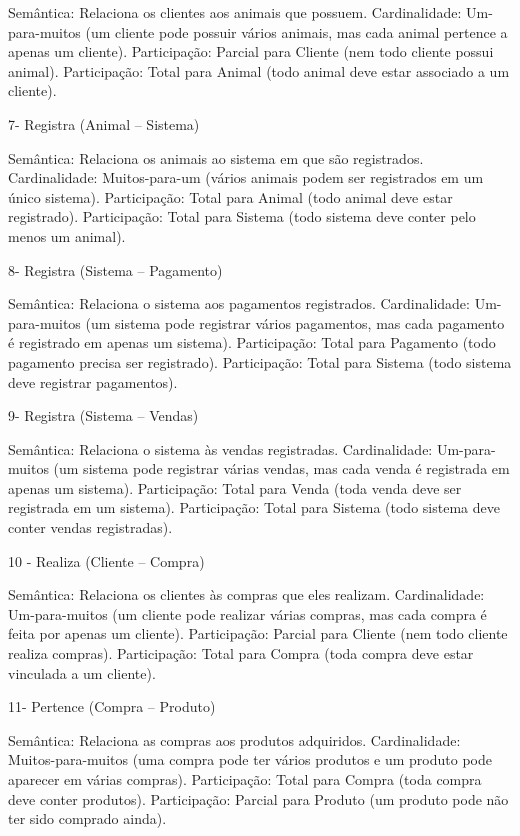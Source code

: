 \documentclass{article}
\begin{document}
Semântica: Relaciona os clientes aos animais que possuem. 
Cardinalidade: Um-para-muitos (um cliente pode possuir vários animais, mas cada animal pertence a apenas um cliente). 
Participação: Parcial para Cliente (nem todo cliente possui animal). 
Participação: Total para Animal (todo animal deve estar associado a um cliente). 

7- Registra (Animal – Sistema) 

Semântica: Relaciona os animais ao sistema em que são registrados. 
Cardinalidade: Muitos-para-um (vários animais podem ser registrados em um único sistema). 
Participação: Total para Animal (todo animal deve estar registrado). 
Participação: Total para Sistema (todo sistema deve conter pelo menos um animal). 

8- Registra (Sistema – Pagamento) 

Semântica: Relaciona o sistema aos pagamentos registrados. 
Cardinalidade: Um-para-muitos (um sistema pode registrar vários pagamentos, mas cada pagamento é registrado em apenas um sistema). 
Participação: Total para Pagamento (todo pagamento precisa ser registrado). 
Participação: Total para Sistema (todo sistema deve registrar pagamentos). 

9- Registra (Sistema – Vendas) 

Semântica: Relaciona o sistema às vendas registradas. 
Cardinalidade: Um-para-muitos (um sistema pode registrar várias vendas, mas cada venda é registrada em apenas um sistema). 
Participação: Total para Venda (toda venda deve ser registrada em um sistema). 
Participação: Total para Sistema (todo sistema deve conter vendas registradas). 

10 - Realiza (Cliente – Compra) 

Semântica: Relaciona os clientes às compras que eles realizam. 
Cardinalidade: Um-para-muitos (um cliente pode realizar várias compras, mas cada compra é feita por apenas um cliente). 
Participação: Parcial para Cliente (nem todo cliente realiza compras). 
Participação: Total para Compra (toda compra deve estar vinculada a um cliente). 

11- Pertence (Compra – Produto) 

Semântica: Relaciona as compras aos produtos adquiridos. 
Cardinalidade: Muitos-para-muitos (uma compra pode ter vários produtos e um produto pode aparecer em várias compras). 
Participação: Total para Compra (toda compra deve conter produtos). 
Participação: Parcial para Produto (um produto pode não ter sido comprado ainda). 
\end{document}
